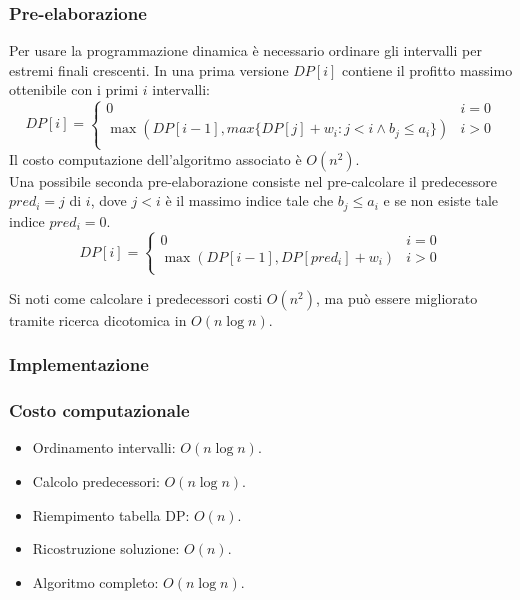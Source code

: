 		\subsubsection{Pre-elaborazione}
			Per usare la programmazione dinamica \`e necessario ordinare gli intervalli per estremi finali crescenti. In una prima versione $DP[i]$ contiene il profitto massimo ottenibile con i
			primi $i$ intervalli:
			$$DP[i] =\begin{cases}
				0 & i = 0\\
				\max(DP[i-1], max\{DP[j]+w_i: j < i \land b_j\le a_i\}) & i >0\\
			\end{cases}$$
			Il costo computazione dell'algoritmo associato \`e $O(n^2)$.\\
			Una possibile seconda pre-elaborazione consiste nel pre-calcolare il predecessore $pred_i = j$ di $i$, dove $j < i$ \`e il massimo indice tale che $b_j\le a_i$ e se non esiste tale 
			indice $pred_i = 0$. 
			$$DP[i] = \begin{cases}
				0 & i = 0\\
				\max(DP[i-1], DP[pred_i]+w_i) & i > 0\\
			\end{cases}$$
			
			Si noti come calcolare i predecessori costi $O(n^2)$, ma pu\`o essere migliorato tramite ricerca dicotomica in $O(n\log n)$. 
		\subsubsection{Implementazione}
			
		\subsubsection{Costo computazionale}
			\begin{itemize}
				\item Ordinamento intervalli: $O(n\log n)$.
				\item Calcolo predecessori: $O(n\log n)$.
				\item Riempimento tabella DP: $O(n)$.
				\item Ricostruzione soluzione: $O(n)$.
				\item Algoritmo completo: $O(n\log n)$.
			\end{itemize}

